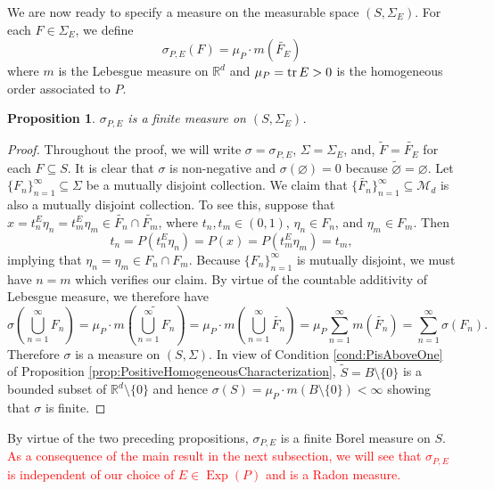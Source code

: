 \documentclass[11pt]{article}
\newtheorem{proposition}[theorem]{Proposition}
\newcommand\Exp{\operatorname{Exp}}
\begin{document}
\noindent We are now ready to specify a measure on the measurable space $(S,\Sigma_{E})$. For each $F\in \Sigma_{E}$, we define
\begin{equation*}
\sigma_{P,E}(F)=\mu_P\cdot m(\widetilde{F_E})
\end{equation*}
where $m$ is the Lebesgue measure on $\mathbb{R}^d$ and $\mu_P=\tr E>0$ is the homogeneous order associated to $P$.

\begin{proposition}\label{prop:sigmaisameaure}
$\sigma_{P,E}$ is a finite measure on $(S,\Sigma_{E})$.
\end{proposition}
\begin{proof}

\noindent Throughout the proof, we will write $\sigma=\sigma_{P,E}$, $\Sigma=\Sigma_{E}$, and, $\widetilde{F}=\widetilde{F_E}$ for each $F\subseteq S$. It is clear that $\sigma$ is non-negative and $\sigma(\varnothing)=0$ because $\widetilde{\varnothing}=\varnothing$. Let $\{ F_n  \}^\infty_{n=1} \subseteq \Sigma $ be a mutually disjoint collection. We claim that $\{ \widetilde{F_n} \}_{n=1}^\infty\subseteq\mathcal{M}_d$ is also a mutually disjoint collection. To see this, suppose that $x = t_n^E \eta_n = t_m^E \eta_m\in \widetilde{F_n}\cap\widetilde{F_m}$, where $t_n,t_m \in (0,1)$, $\eta_n \in F_n$, and $\eta_m \in F_m $. Then
\begin{equation*}
    t_n = P(t_n^E \eta_n) = P(x) = P(t_m^E \eta_m) = t_m,
\end{equation*}
implying that $\eta_n = \eta_m\in F_n\cap F_m$. Because $\{F_n\}_{n=1}^\infty$ is mutually disjoint, we must have $n=m$ which verifies our claim. By virtue of the countable additivity of Lebesgue measure, we therefore have
\begin{equation*}
\sigma\left(\bigcup_{n=1}^\infty F_n\right)
    = \mu_P\cdot m\left( \widetilde{\bigcup^\infty_{n=1} F_n } \right)=\mu_P\cdot m\left( \bigcup^\infty_{n=1}\widetilde{F_n} \right)
    = \mu_P\sum^\infty_{n=1} m(\widetilde{F_n})
    = \sum^\infty_{n=1}\sigma(F_n).
\end{equation*}
Therefore $\sigma$ is a measure on $(S,\Sigma)$. In view of Condition \ref{cond:PisAboveOne} of Proposition \ref{prop:PositiveHomogeneousCharacterization}, $\widetilde{S}=B\setminus\{0\}$ is a bounded subset of $\mathbb{R}^d\setminus\{0\}$ and hence $\sigma(S)=\mu_P\cdot m(B\setminus\{0\})<\infty$ showing that $\sigma$ is finite.
\end{proof}

\noindent By virtue of the two preceding propositions, $\sigma_{P,E}$ is a finite Borel measure on $S$. \textcolor{red}{As a consequence of the main result in the next subsection, we will see that $\sigma_{P,E}$ is independent of our choice of $E\in\Exp(P)$ and is a Radon measure.}
\end{document}
